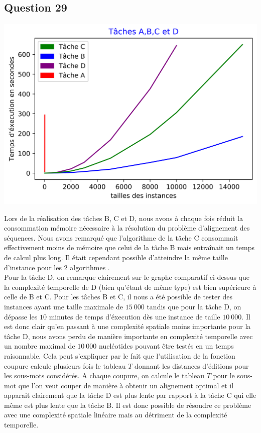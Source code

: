\documentclass[12pt, a4paper]{report}
\begin{document}
\subsection{Question 29}
\begin{center}
\includegraphics[scale=0.75]{TD2.png}
\end{center}
Lors de la réalisation des tâches B, C et D, nous avons à chaque fois réduit la consommation mémoire nécessaire à la résolution du problème d'alignement des séquences. Nous avons remarqué que l'algorithme de la tâche C consommait effectivement moins de mémoire que celui de la tâche B mais entraînait un temps de calcul plus long. Il était cependant possible d'atteindre la même taille d'instance pour les 2 algorithmes .\\
Pour la tâche D, on remarque clairement sur le graphe comparatif ci-dessus que la complexité temporelle de D (bien qu'étant de même type) est bien supérieure à celle de B et C. Pour les tâches B et C, il nous a été possible de tester des instances ayant une taille maximale de $15\ 000$ tandis que pour la tâche D, on dépasse les $10$ minutes de temps d'éxecution dès une instance de taille $10\ 000$. Il est donc clair qu'en passant à une complexité spatiale moins importante pour la tâche D, nous avons perdu de manière importante en complexité temporelle avec un nombre maximal de $10\ 000$ nucléotides pouvant être testés en un temps raisonnable. Cela peut s'expliquer par le fait que l'utilisation de la fonction coupure calcule plusieurs fois le tableau $T$ donnant les distances d'éditions pour les sous-mots considérés. A chaque coupure, on calcule le tableau $T$ pour le sous-mot que l'on veut couper de manière à obtenir un alignement optimal et il apparait clairement que la tâche D est plus lente par rapport à la tâche C qui elle même est plus lente que la tâche B. Il est donc possible de résoudre ce problème avec une complexité spatiale linéaire mais au détriment de la complexité temporelle.
\end{document}
